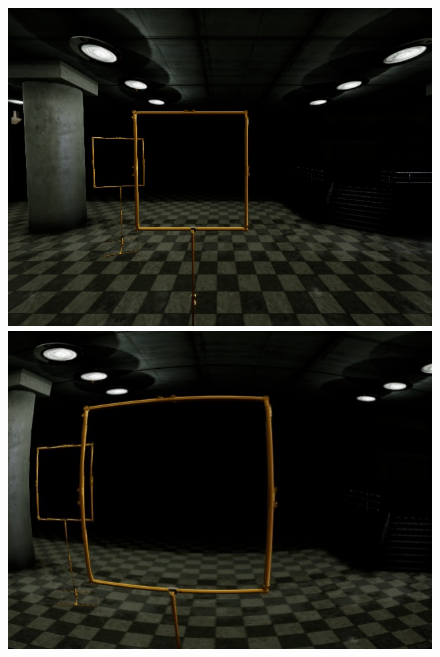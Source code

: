 \begin{figure}[htbp]
	\begin{minipage}{0.33\textwidth}
		\includegraphics[width=\textwidth]{fig/gate_example}
	\end{minipage}
	\begin{minipage}{0.33\textwidth}
		\includegraphics[width=\textwidth]{fig/gate_example_distorted}
	\end{minipage}
	\begin{minipage}{0.33\textwidth}

\end{minipage}
\end{figure}
